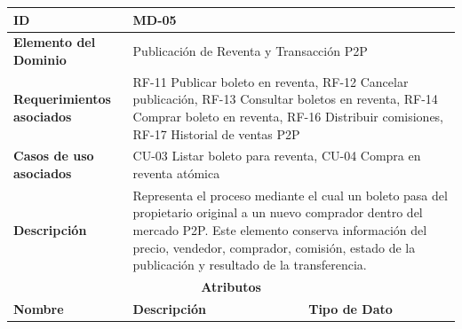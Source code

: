 \documentclass[12pt,letterpaper]{article}
\begin{document}
\begin{table}[H]
\centering
\scriptsize
\renewcommand{\arraystretch}{1.12}
\setlength{\tabcolsep}{4pt}

\begin{tabularx}{\textwidth}{|p{3.2cm}|X|p{3.8cm}|}
\hline
\textbf{ID} & MD-05 & \\ \hline

\textbf{Elemento del Dominio} & 
\multicolumn{2}{X|}{Publicación de Reventa y Transacción P2P} \\ \hline

\textbf{Requerimientos asociados} & 
\multicolumn{2}{X|}{RF-11 Publicar boleto en reventa, RF-12 Cancelar publicación, RF-13 Consultar boletos en reventa, RF-14 Comprar boleto en reventa, RF-16 Distribuir comisiones, RF-17 Historial de ventas P2P} \\ \hline

\textbf{Casos de uso asociados} & 
\multicolumn{2}{X|}{CU-03 Listar boleto para reventa, CU-04 Compra en reventa atómica} \\ \hline

\textbf{Descripción} & 
\multicolumn{2}{X|}{Representa el proceso mediante el cual un boleto pasa del propietario original a un nuevo comprador dentro del mercado P2P. Este elemento conserva información del precio, vendedor, comprador, comisión, estado de la publicación y resultado de la transferencia.} \\ \hline

\multicolumn{3}{|c|}{\textbf{Atributos}} \\ \hline

\textbf{Nombre} & \textbf{Descripción} & \textbf{Tipo de Dato} \\ \hline


\end{tabularx}
\end{table}
\end{document}
